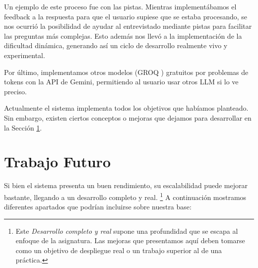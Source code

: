 \documentclass[12pt, a4paper]{article}
\begin{document}
Un ejemplo de este proceso fue con las pistas. Mientras implementábamos el feedback a la respuesta para que el usuario supiese que se estaba procesando, se nos ocurrió la posibilidad de ayudar al entrevistado mediante pistas para facilitar las preguntas más complejas. Esto además nos llevó a la implementación de la dificultad dinámica, generando así un ciclo de desarrollo realmente vivo y experimental.

Por último, implementamos otros modelos (GROQ \cite{groq2024}) gratuitos por problemas de tokens con la API de Gemini, permitiendo al usuario usar otros LLM si lo ve preciso.

Actualmente el sistema implementa todos los objetivos que habíamos planteado. Sin embargo, existen ciertos conceptos o mejoras que dejamos para desarrollar en la Sección \ref{sec:trabajo_futuro}.

\section{Trabajo Futuro}
\label{sec:trabajo_futuro}

Si bien el sistema presenta un buen rendimiento, su escalabilidad puede mejorar bastante, llegando a un desarrollo completo y real. \footnote{Este \textit{Desarrollo completo y real} supone una profundidad que se escapa al enfoque de la asignatura. Las mejoras que presentamos aquí deben tomarse como un objetivo de despliegue real o un trabajo superior al de una práctica.} A continuación mostramos diferentes apartados que podrían incluirse sobre nuestra base:
\end{document}
